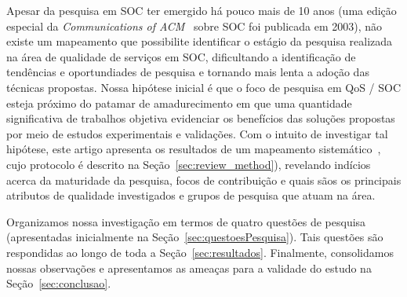 Apesar da pesquisa em SOC ter emergido h\'{a} pouco mais de 10 anos (uma edi\c c\~{a}o especial da \emph{Communications of ACM}~\cite{papazoglou:cacm2003} sobre SOC foi publicada em 2003), n\~{a}o existe um mapeamento que possibilite identificar o est\'{a}gio da pesquisa realizada na \'{a}rea de qualidade de servi\c cos em SOC, dificultando a identifica\c c\~{a}o de tend\^{e}ncias e oportundiades de pesquisa e tornando mais lenta a ado\c c\~{a}o das t\'{e}cnicas propostas. Nossa hip\'{o}tese inicial \'{e} que o foco de pesquisa em QoS / SOC esteja próximo do patamar de amadurecimento em que uma quantidade significativa de trabalhos objetiva evidenciar os benef\'{i}cios das solu\c c\~{o}es propostas por meio de estudos experimentais e valida\c c\~{o}es. Com o intuito de investigar tal hip\'{o}tese, este artigo apresenta os resultados de um mapeamento sistem\'{a}tico~\cite{petersen:sms2008}, cujo protocolo \'{e} descrito na Seção~\ref{sec:review_method}), revelando indícios acerca da maturidade da pesquisa, focos de contribuição e quais s\~{a}os os principais atributos de qualidade investigados e grupos de pesquisa que atuam na \'{a}rea. 

Organizamos nossa investiga\c{c}\~{a}o em termos de quatro quest\~{o}es de pesquisa (apresentadas inicialmente na Seção~\ref{sec:questoesPesquisa}). Tais questões são respondidas ao longo de toda a Se\c c\~{a}o~\ref{sec:resultados}. Finalmente, consolidamos nossas observa\c c\~{o}es e apresentamos as amea\c cas para a validade do estudo na Se\c c\~{a}o~\ref{sec:conclusao}.  


